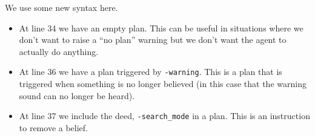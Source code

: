 We use some new syntax here.  
\begin{itemize}
\item At line 34 we have an empty plan.  This can be useful in
  situations where we don't want to raise a ``no plan'' warning but we
  don't want the agent to actually do
  anything. 
\item At line 36 we have a plan triggered by \lstinline{-warning}.
  This is a plan that is triggered when something is no longer
  believed (in this case that the warning sound can no longer be
  heard). 
\item At line 37 we include the deed, \lstinline{-search_mode} in a
  plan.  This is an instruction to remove a
  belief. 
\end{itemize}

